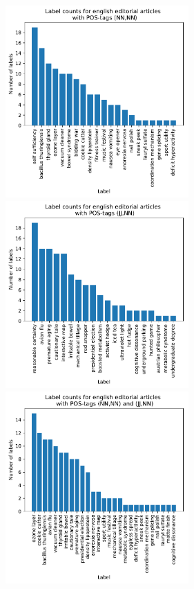 {%
\begin{figure}
	\centering
	\begin{minipage}[b]{0.5\textwidth}
		\includegraphics[width=7cm]{gfx/POS-gen1/mit_NN.pdf}
	\end{minipage}%
	\begin{minipage}[b]{0.5\textwidth}
		\includegraphics[width=7cm]{gfx/POS-gen1/mit_JJNN.pdf}
	\end{minipage}
	\begin{minipage}[b]{0.5\textwidth}
		\includegraphics[width=7cm]{gfx/POS-gen1/mit_beiden_pos.pdf}

\end{minipage}
\end{figure}}

